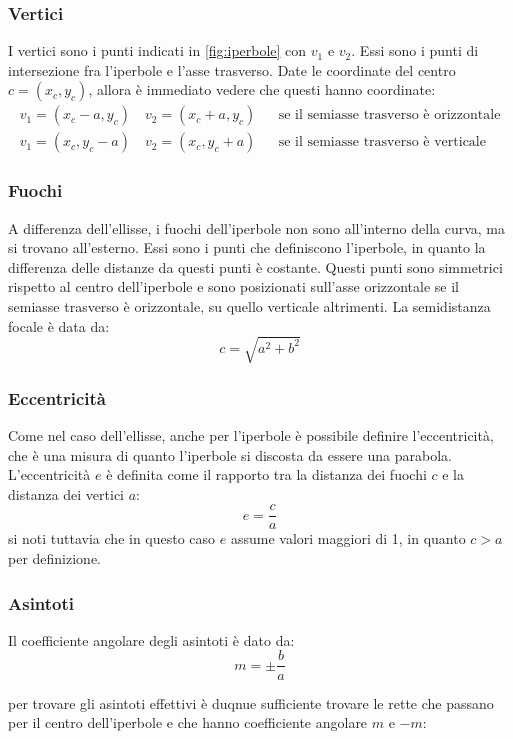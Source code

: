 \subsubsection{Vertici}

I vertici sono i punti indicati in \cref{fig:iperbole} con $ v_1 $ e $ v_2 $. Essi sono i punti di intersezione fra l'iperbole e l'asse trasverso. Date le coordinate del centro $ c = \left(x_c, y_c\right) $, allora è immediato vedere che questi hanno coordinate:
\begin{align*}
	v_1  = \left(x_c - a, y_c\right) \quad  v_2  = \left(x_c + a, y_c\right) &  & \text{se il semiasse trasverso è orizzontale} \\
	v_1  = \left(x_c, y_c - a\right) \quad  v_2  = \left(x_c, y_c + a\right) &  & \text{se il semiasse trasverso è verticale}
\end{align*}

\subsubsection{Fuochi}
A differenza dell'ellisse, i fuochi dell'iperbole non sono all'interno della curva, ma si trovano all'esterno. Essi sono i punti che definiscono l'iperbole, in quanto la differenza delle distanze da questi punti è costante. Questi punti sono simmetrici rispetto al centro dell'iperbole e sono posizionati sull'asse orizzontale se il semiasse trasverso è orizzontale, su quello verticale altrimenti. La semidistanza focale è data da:
\[
	c = \sqrt{a^2 + b^2}
\]

\subsubsection{Eccentricità}
Come nel caso dell'ellisse, anche per l'iperbole è possibile definire l'eccentricità, che è una misura di quanto l'iperbole si discosta da essere una parabola. L'eccentricità $ e $ è definita come il rapporto tra la distanza dei fuochi $ c $ e la distanza dei vertici $ a $:
\[
	e = \frac{c}{a}
\]
si noti tuttavia che in questo caso $ e $ assume valori maggiori di 1, in quanto $ c > a $ per definizione.

\subsubsection{Asintoti}
Il coefficiente angolare degli asintoti è dato da:
\[
	m = \pm \frac{b}{a}
\]

per trovare gli asintoti effettivi è duqnue sufficiente trovare le rette che passano per il centro dell'iperbole e che hanno coefficiente angolare $ m $ e $ -m $:






